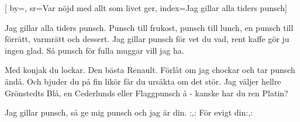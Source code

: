 

[ 		%
	by={},					%
	sr={Var nöjd med allt som livet ger},					%
	index={Jag gillar alla tiders punsch}]						%



\beginverse*						%
Jag gillar alla tiders punsch.
Punsch till frukost, punsch till lunch,
en punsch till förrätt, varmrätt och dessert.
Jag gillar punsch för vet du vad,
rent kaffe gör ju ingen glad.
Så punsch för fulla muggar vill jag ha.
\endverse							%

\beginverse*						%
Med konjak du lockar.
Den bästa Renault.
Förlåt om jag chockar
och tar punsch ändå.
Och bjuder du på fin likör
får du ursäkta om det stör.
Jag väljer hellre Grönstedts Blå,
en Cederlunds eller Flaggpunsch å
- kanske har du ren Platin?
\endverse							%

\beginverse*						%
Jag gillar punsch,
så ge mig punsch och jag är din.
:,: För evigt din:,:
\endverse							%

\endsong							%
